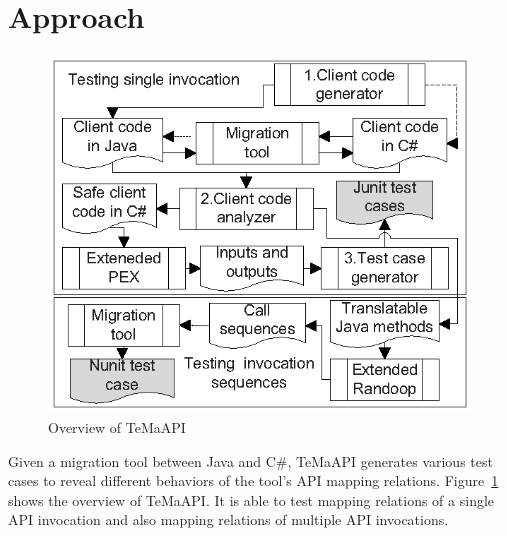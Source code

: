 \section{Approach}
\label{sec:approach}
\begin{figure}[t]
\centering
\includegraphics[scale=1,clip]{figure/approach.eps}\vspace*{-3ex}
 \caption{Overview of TeMaAPI}\vspace*{-4ex}
 \label{fig:approach}
\end{figure}
Given a migration tool between Java and C\#, TeMaAPI generates various test cases to reveal different behaviors of the tool's API mapping relations.
Figure~\ref{fig:approach} shows the overview of TeMaAPI. It is able to test mapping relations of a single API invocation and also mapping relations of multiple API invocations.


